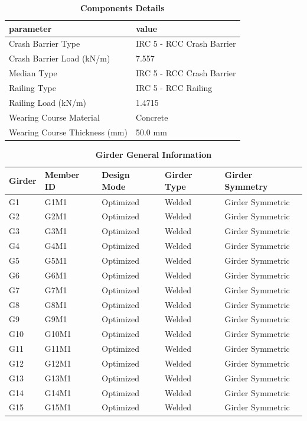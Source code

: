 \documentclass[12pt,a4paper]{report}
\numberwithin{table}{chapter}
\numberwithin{figure}{chapter}
\begin{document}
\begin{longtable}{|L{5.5cm}|p{10.0cm}|}
\caption{\textbf{Components Details}}
\hline
\textbf{parameter} & \textbf{value} \\
\hline
\textnormal{Crash Barrier Type} & IRC 5 - RCC Crash Barrier \\[6pt]
\hline
\textnormal{Crash Barrier Load (kN/m)} & 7.557 \\[6pt]
\hline
\textnormal{Median Type} & IRC 5 - RCC Crash Barrier \\[6pt]
\hline

\textnormal{Railing Type} & IRC 5 - RCC Railing \\[6pt]
\hline
\textnormal{Railing Load (kN/m)} & 1.4715 \\[6pt]
\hline
\textnormal{Wearing Course Material} & Concrete \\[6pt]
\hline
\textnormal{Wearing Course Thickness (mm)} & 50.0 mm \\[6pt]
\hline
\end{longtable}


\newpage

\vspace{0.4em}
\noindent
            
\vspace{4pt}
\begin{longtable}{|L{2.2cm}|L{1.8cm}|p{3.8cm}|p{3.8cm}|p{3.8cm}|}
\caption{\textbf{Girder General Information}}
\hline
\textbf{Girder} & \textbf{Member ID} & \textbf{Design Mode} & \textbf{Girder Type} & \textbf{Girder Symmetry} \\[6pt]
\hline
G1 & G1M1 & Optimized & Welded & Girder Symmetric \\[8pt]
\hline
G2 & G2M1 & Optimized & Welded & Girder Symmetric \\[8pt]
\hline
G3 & G3M1 & Optimized & Welded & Girder Symmetric \\[8pt]
\hline
G4 & G4M1 & Optimized & Welded & Girder Symmetric \\[8pt]
\hline
G5 & G5M1 & Optimized & Welded & Girder Symmetric \\[8pt]
\hline
G6 & G6M1 & Optimized & Welded & Girder Symmetric \\[8pt]
\hline
G7 & G7M1 & Optimized & Welded & Girder Symmetric \\[8pt]
\hline
G8 & G8M1 & Optimized & Welded & Girder Symmetric \\[8pt]
\hline
G9 & G9M1 & Optimized & Welded & Girder Symmetric \\[8pt]
\hline
G10 & G10M1 & Optimized & Welded & Girder Symmetric \\[8pt]
\hline
G11 & G11M1 & Optimized & Welded & Girder Symmetric \\[8pt]
\hline
G12 & G12M1 & Optimized & Welded & Girder Symmetric \\[8pt]
\hline
G13 & G13M1 & Optimized & Welded & Girder Symmetric \\[8pt]
\hline
G14 & G14M1 & Optimized & Welded & Girder Symmetric \\[8pt]
\hline
G15 & G15M1 & Optimized & Welded & Girder Symmetric \\[8pt]
\hline
\end{longtable}
\end{document}
